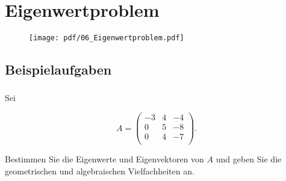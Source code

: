 \section{Eigenwertproblem}
\begin{figure}[h!]
    \texttt{[image: pdf/06\_Eigenwertproblem.pdf]}
\end{figure}
\newpage



\subsection{Beispielaufgaben} 

\vspace{1cm}

\subsubsection{} %

Sei 

\begin{equation*}
    A = \begin{pmatrix}
    -3 & 4 & -4 \\
    0 & 5 & -8 \\
    0 & 4 & -7 \\
    \end{pmatrix}.
\end{equation*}

Bestimmen Sie die Eigenwerte und Eigenvektoren von \( A \) und geben Sie die geometrischen und algebraischen Vielfachheiten an. \\

\vspace{1\baselineskip}

